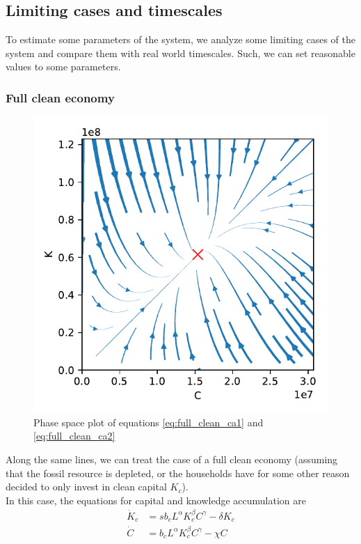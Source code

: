\subsection{Limiting cases and timescales} 

To estimate some parameters of the system, we analyze some limiting cases of the system and compare them with real world timescales. Such, we can set reasonable values to some parameters.


\subsubsection{Full clean economy}
\label{sec:full_clean_economy}

\begin{figure}
	\vspace{-1.8 cm}
	\includegraphics[width = .55 \textwidth]{./figures/phasespace.pdf}
        \caption{Phase space plot of equations \eqref{eq:full_clean_ca1} and \eqref{eq:full_clean_ca2} \label{phase_space_plot}}
\end{figure}
Along the same lines, we can treat the case of a full clean economy (assuming that the fossil resource is depleted, or the households have for some other reason decided to only invest in clean capital $K_c$). \\
In this case, the equations for capital and knowledge accumulation are
\begin{subequations}
\begin{align}
    \dot{K}_c &= s b_c L^{\alpha} K_c^{\beta} C^\gamma - \delta K_c \label{eq:full_clean_ca1} \\
	\dot{C} &= b_c L^\alpha K_c^\beta C^\gamma - \chi C \label{eq:full_clean_ca2}
\end{align}
\end{subequations}
